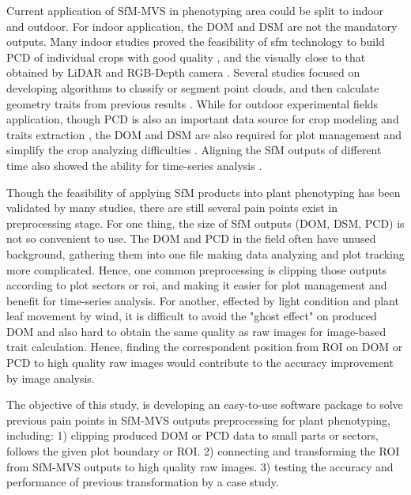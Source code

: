\documentclass[doublespacing]{configs/bmcart}
\begin{document}
Current application of SfM-MVS in phenotyping area could be split to indoor and outdoor. For indoor application, the DOM and DSM are not the mandatory outputs. Many indoor studies proved the feasibility of \acrshort*{sfm} technology to build PCD of individual crops with good quality \cite{wang_maize_2019, rossi_performances_2020}, and the visually close to that obtained by LiDAR \cite{thapa_novel_2018} and RGB-Depth camera \cite{martinez-guanter_low-cost_2019}. Several studies focused on developing algorithms to classify or segment point clouds, and then calculate geometry traits from previous results \cite{ziamtsov_machine_2019, artzet_phenomenal_2019}. While for outdoor experimental fields application, though PCD is also an important data source for crop modeling and traits extraction \cite{jay_field_2015, sun_three-dimensional_2020, zhu_quantification_2020}, the DOM and DSM are also required for plot management and simplify the crop analyzing difficulties \cite{sun_field_2018, tresch_easympe_2019, chen_grid_2020}. Aligning the SfM outputs of different time also showed the ability for time-series analysis \cite{dong_4d_2017, han_clustering_2018}.

Though the feasibility of applying SfM products into plant phenotyping has been validated by many studies, there are still several pain points exist in preprocessing stage. For one thing, the size of SfM outputs (DOM, DSM, PCD) is not so convenient to use. The DOM and PCD in the field often have unused background, gathering them into one file making data analyzing and plot tracking more complicated. Hence, one common preprocessing is clipping those outputs according to plot sectors or \acrfull*{roi}, and making it easier for plot management and benefit for time-series analysis. For another, effected by light condition and plant leaf movement by wind, it is difficult to avoid the "ghost effect" on produced DOM and also hard to obtain the same quality as raw images for image-based trait calculation. Hence, finding the correspondent position from ROI on DOM or PCD to high quality raw images would contribute to the accuracy improvement by image analysis.

The objective of this study, is developing an easy-to-use software package to solve previous pain points in SfM-MVS outputs preprocessing for plant phenotyping, including: 1) clipping produced DOM or PCD data to small parts or sectors, follows the given plot boundary or ROI. 2) connecting and transforming the ROI from SfM-MVS outputs to high quality raw images. 3) testing the accuracy and performance of previous transformation by a case study.
\end{document}
